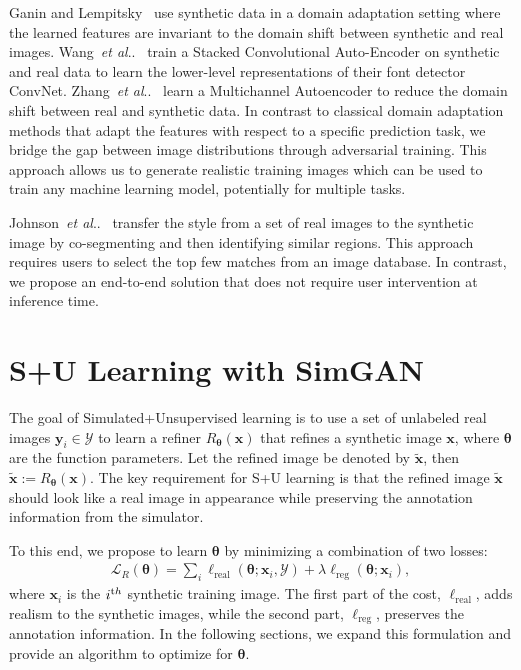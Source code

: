 \documentclass[10pt,twocolumn,letterpaper]{article}
\makeatletter
\DeclareRobustCommand\onedot{\futurelet\@let@token\@onedot}
\def\@onedot{\ifx\@let@token.\else.\null\fi\xspace}
\def\etal{\emph{et al}\onedot}
\makeatother
\begin{document}
Ganin and Lempitsky~\cite{Ganin14} use synthetic data in a domain adaptation setting where the learned features are invariant to the domain shift between synthetic and real images. 
Wang~\etal~\cite{Wang15} train a Stacked Convolutional Auto-Encoder on synthetic and real data to learn the lower-level representations of their font detector ConvNet.
Zhang~\etal~\cite{Zhang15} learn a Multichannel Autoencoder to reduce the domain shift between real and synthetic data.
In contrast to classical domain adaptation methods that adapt the features with respect to a specific prediction task, we bridge the gap between image distributions through adversarial training. 
This approach allows us to generate realistic training images which can be used to train any machine learning model, potentially for multiple tasks.

Johnson~\etal~\cite{johnson11cg2real} transfer the style from a set of real images to  the synthetic image by co-segmenting and then identifying similar regions. 
This approach requires users to select the top few matches from an image database. 
In contrast, we propose an end-to-end solution that does not require user intervention at inference time. 




\section{S+U Learning with SimGAN}


The goal of Simulated+Unsupervised learning is to use a set of unlabeled real images $\mathbf y_i \in \mathcal Y$ to learn a refiner $R_{\boldsymbol{\theta}} (\mathbf x)$ that refines a synthetic image $\mathbf x $, where $\boldsymbol {\theta} $  are the function parameters. 
Let the refined image be denoted by  $\tilde{\mathbf x}$, then
$\tilde{\mathbf x} := R_{\boldsymbol{\theta}}(\mathbf x).$
The key requirement for S+U learning is that the refined image $\tilde{\mathbf x} $ should look like a real image in appearance while preserving the annotation information from the simulator.


To this end, we propose to learn $\boldsymbol \theta$ by minimizing a combination of two losses:
\begin{align}
{\mathcal L}_R(\boldsymbol \theta) = \sum_i  \ell_{\text{real}} (\boldsymbol \theta; \mathbf x_i, \mathcal Y ) + \lambda \ell_{\text{reg}} (\boldsymbol \theta;  {\mathbf x_i}),
\label{eq:L_R_self_reg}
\end{align}
where $\mathbf x_i$ is the $i^{\text th}$ synthetic training image. 
The first part of the cost, $ \ell_{\text{real}}$, adds realism to the synthetic images, while the second part, $\ell_{\text{reg}}$, preserves the annotation information.
In the following sections, we expand this formulation and provide an algorithm to optimize for $\boldsymbol \theta$.
\end{document}
